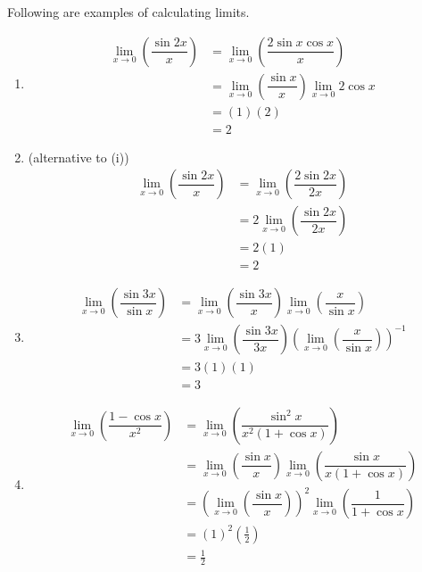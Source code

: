 \begin{example}
    Following are examples of calculating limits.
    \begin{enumerate}
        \item 
        \begin{align*}
            \lim_{x\to0}\left(\dfrac{\sin{2x}}x\right)&=\lim_{x\to0}\left(\dfrac{2\sin{x}\cos{x}}{x}\right)\\
            &=\lim_{x\to0}\left(\dfrac{\sin{x}}{x}\right)\lim_{x\to0}2\cos{x}\\
            &=(1)(2)\\
            &=2
        \end{align*}
        
        \item (alternative to (i))
        \begin{align*}
            \lim_{x\to0}\left(\dfrac{\sin{2x}}{x}\right)&=\lim_{x\to0}\left(\dfrac{2\sin{2x}}{2x}\right)\\
            &=2\lim_{x\to0}\left(\dfrac{\sin{2x}}{2x}\right)\\
            &=2(1)\\
            &=2
        \end{align*}
        
        \item
        \begin{align*}
            \lim_{x\to0}\left(\dfrac{\sin{3x}}{\sin{x}}\right)&=\lim_{x\to0}\left(\dfrac{\sin{3x}}{x}\right)\lim_{x\to0}\left(\dfrac{x}{\sin{x}}\right)\\
            &=3\lim_{x\to0}\left(\dfrac{\sin{3x}}{3x}\right)\left(\lim_{x\to0}\left(\dfrac{x}{\sin{x}}\right)\right)^{-1}\\
            &=3(1)(1)\\
            &=3
        \end{align*}
        
        \item 
        \begin{align*}
            \lim_{x\to0}\left(\dfrac{1-\cos{x}}{x^2}\right)&=\lim_{x\to0}\left(\dfrac{\sin^2{x}}{x^2(1+\cos{x})}\right)\\
            &=\lim_{x\to0}\left(\dfrac{\sin{x}}{x}\right)\lim_{x\to0}\left(\dfrac{\sin{x}}{x(1+\cos{x})}\right)\\
            &=\left(\lim_{x\to0}\left(\dfrac{\sin{x}}{x}\right)\right)^2\lim_{x\to0}\left(\dfrac{1}{1+\cos{x}}\right)\\
            &=(1)^2\left(\frac12\right)\\
            &=\frac12
        \end{align*}
    \end{enumerate}
\end{example}

